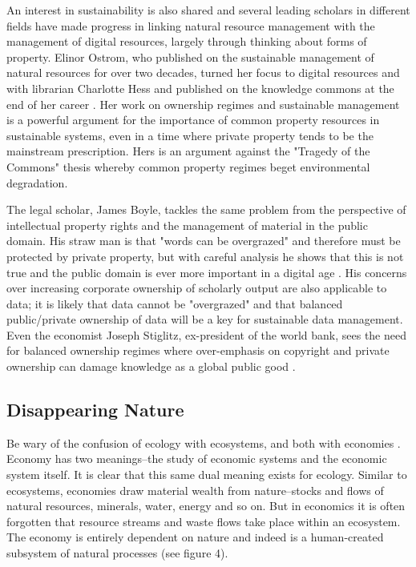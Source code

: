 An interest in sustainability is also shared and several leading scholars in different fields have made progress in linking natural resource management with the management of digital resources, largely through thinking about forms of property. Elinor Ostrom, who published on the sustainable management of natural resources for over two decades, turned her focus to digital resources and with librarian Charlotte Hess and published on the knowledge commons at the end of her career \citep{hess_2006}. Her work on ownership regimes and sustainable management is a powerful argument for the importance of common property resources in sustainable systems, even in a time where private property tends to be the mainstream prescription. Hers is an argument against the "Tragedy of the Commons" thesis whereby common property regimes beget environmental degradation.

The legal scholar, James Boyle, tackles the same problem from the perspective of intellectual property rights and the management of material in the public domain. His straw man is that "words can be overgrazed" and therefore must be protected by private property, but with careful analysis he shows that this is not true and the public domain is ever more important in a digital age \citep[][footnote 15 on p. 5]{boyle_2003}. His concerns over increasing corporate ownership of scholarly output are also applicable to data; it is likely that data cannot be "overgrazed" and that balanced public/private ownership of data will be a key for sustainable data management. Even the economist Joseph Stiglitz, ex-president of the world bank, sees the need for balanced ownership regimes where over-emphasis on copyright and private ownership can damage knowledge as a global public good \citep{stiglitz_1999}.

\subsection{Disappearing Nature}

Be wary of the confusion of ecology with ecosystems, and both with economies \citep[cf. ][]{lucas_2012,nardi_information_1999}. Economy has two meanings--the study of economic systems and the economic system itself. It is clear that this same dual meaning exists for ecology. Similar to ecosystems, economies draw material wealth from nature--stocks and flows of natural resources, minerals, water, energy and so on. But in economics it is often forgotten that resource streams and waste flows take place within an ecosystem. The economy is entirely dependent on nature and indeed is a human-created subsystem of natural processes (see figure 4).


